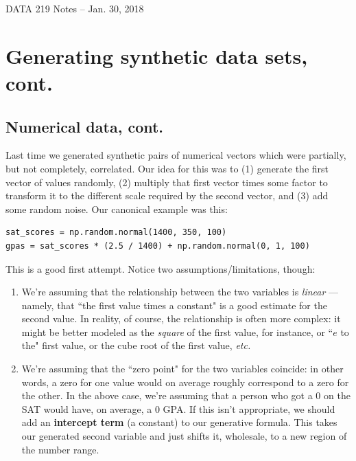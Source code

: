 \documentclass[12pt]{article}
\begin{document}
\begin{center}
\begin{Large}
DATA 219 Notes -- Jan. 30, 2018
\end{Large}
\end{center}

\section{Generating synthetic data sets, cont.}

\subsection{Numerical data, cont.}

Last time we generated synthetic pairs of numerical vectors which were
partially, but not completely, correlated. Our idea for this was to (1)
generate the first vector of values randomly, (2) multiply that first vector
times some factor to transform it to the different scale required by the
second vector, and (3) add some random noise. Our canonical example was this:

\begin{Verbatim}[fontsize=\footnotesize,samepage=true]
sat_scores = np.random.normal(1400, 350, 100)
gpas = sat_scores * (2.5 / 1400) + np.random.normal(0, 1, 100)
\end{Verbatim}

This is a good first attempt. Notice two assumptions/limitations, though:

\begin{enumerate}
\item We're assuming that the relationship between the two variables is
\textit{linear} --- namely, that ``the first value times a constant" is a good
estimate for the second value. In reality, of course, the relationship is
often more complex: it might be better modeled as the \textit{square} of the
first value, for instance, or ``$e$ to the" first value, or the cube root of
the first value, \textit{etc.}
\item We're assuming that the ``zero point" for the two variables coincide:
in other words, a zero for one value would on average roughly correspond to a
zero for the other. In the above case, we're assuming that a person who got a
0 on the SAT would have, on average, a 0 GPA. If this isn't appropriate, we
should add an \textbf{intercept term} (a constant) to our generative formula.
This takes our generated second variable and just shifts it, wholesale, to a
new region of the number range.
\end{enumerate}
\end{document}
